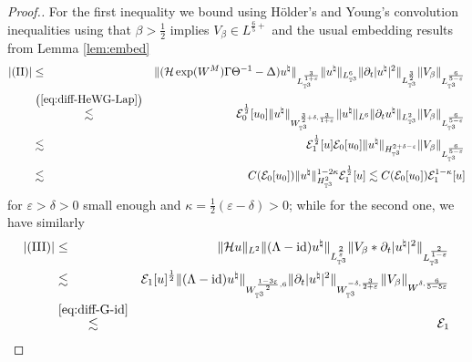 \begin{proof}[Proof.]For the first inequality we bound using H{\"o}lder's and Young's convolution
  inequalities using that $\beta > \frac{1}{2}$ implies $V_{\beta} \in
  L^{\frac{6}{5} +}$ and the usual embedding results from Lemma
  \ref{lem:embed}
  \begin{eqnarray*}
    | (\mathrm{I} \mathrm{I}) | & \leq & \| (\mathcal{H} \exp (W^M) \Gamma \Theta^{- 1}
    - \Delta) u^{\natural} \|_{L^{\frac{3}{1 + \varepsilon}}_{\mathbb{T}^3}}
    \| u^{\natural} \|_{L^6_{\mathbb{T}^3}} \| \partial_t | u^{\natural} |^2
    \|_{L^{\frac{3}{2}}_{\mathbb{T}^3}} \| V_{\beta} \|_{{{L^{\frac{6}{5 -
    \varepsilon}}_{\mathbb{T}^3}} }  }\\
    & \overset{\left( \ref{eq:diff-HeWG-Lap} \right)}{\lesssim} &
    \mathcal{E}^{\frac{1}{2}}_0 [u_0] \| u^{\natural} \|_{W^{\frac{3}{2} +
    \delta, \frac{3}{1 + \varepsilon}}_{\mathbb{T}^3}} \| u^{\natural}
    \|_{L^6} \| \partial_t u^{\natural} \|_{L^2_{\mathbb{T}^3}} \| V_{\beta}
    \|_{{{L^{\frac{6}{5 - \varepsilon}}_{\mathbb{T}^3}} }  }\\
    & \overset{}{\lesssim} & \mathcal{E}^{\frac{1}{2}}_1 [u] \mathcal{E}_0
    [u_0] \| u^{\natural} \|_{H^{2 + \delta - \varepsilon }_{\mathbb{T}^3}} \|
    V_{\beta} \|_{{{L^{\frac{6}{5 - \varepsilon}}_{\mathbb{T}^3}} }  }\\
    & \lesssim & C (\mathcal{E}_0 [u_0]) \| u^{\natural} \|^{1 - 2
    \kappa}_{H^{2 }_{\mathbb{T}^3}} \mathcal{E}^{\frac{1}{2}}_1 [u] \lesssim C
    (\mathcal{E}_0 [u_0]) \mathcal{E}^{1 - \kappa}_1 [u]
  \end{eqnarray*}
  for $\varepsilon > \delta > 0$ small enough and $\kappa = \frac{1}{2}
  (\varepsilon - \delta) > 0$; while for the second one, we have similarly
  \begin{eqnarray*}
    | (\mathrm{I} \mathrm{I} \mathrm{I}) | & \leq & \| \mathcal{H} u \|_{L^2} \| (\Lambda -
    \mathrm{id}) u^{\natural} \|_{{L^{\frac{2}{\varepsilon}}_{\mathbb{T}^3}} }
    \| V_{\beta} \ast \partial_t | u^{\natural} |^2
    \|_{L_{\mathbb{T}^3}^{\frac{2}{1 - \varepsilon}}}\\
    & \lesssim & \mathcal{E}_1 [u]^{\frac{1}{2}} \| (\Lambda - \mathrm{id})
    u^{\natural} \|_{{W^{\frac{1 - 3 \varepsilon}{2}, 6}_{\mathbb{T}^3}} } \|
    \partial_t | u^{\natural} |^2 \|_{W_{\mathbb{T}^3}^{- \delta, \frac{3}{2 +
    \varepsilon}}} \| V_{\beta} \|_{W^{\delta, \frac{6}{5 - 5 \varepsilon}}}\\
    & \overset{\eqref{eq:diff-G-id}}{\lesssim} & \mathcal{E}_1

\end{eqnarray*}
\end{proof}
